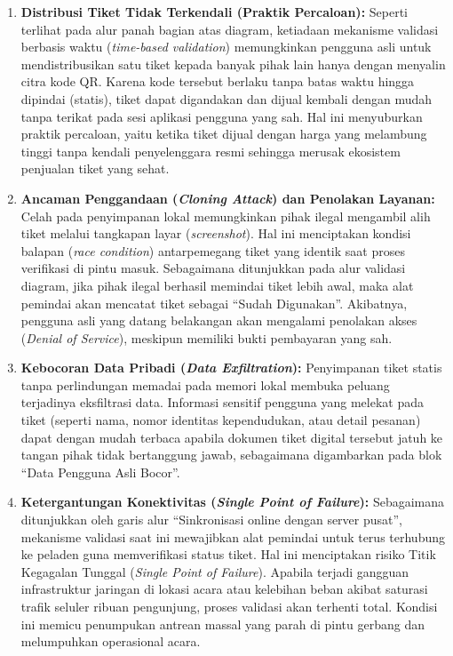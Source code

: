 \begin{enumerate}
    \item \textbf{Distribusi Tiket Tidak Terkendali (Praktik Percaloan):} 
    Seperti terlihat pada alur panah bagian atas diagram, ketiadaan mekanisme validasi berbasis waktu (\textit{time-based validation}) memungkinkan pengguna asli untuk mendistribusikan satu tiket kepada banyak pihak lain hanya dengan menyalin citra kode QR. Karena kode tersebut berlaku tanpa batas waktu hingga dipindai (statis), tiket dapat digandakan dan dijual kembali dengan mudah tanpa terikat pada sesi aplikasi pengguna yang sah. Hal ini menyuburkan praktik percaloan, yaitu ketika tiket dijual dengan harga yang melambung tinggi tanpa kendali penyelenggara resmi sehingga merusak ekosistem penjualan tiket yang sehat.
    
    \item \textbf{Ancaman Penggandaan (\textit{Cloning Attack}) dan Penolakan Layanan:} 
    Celah pada penyimpanan lokal memungkinkan pihak ilegal mengambil alih tiket melalui tangkapan layar (\textit{screenshot}). Hal ini menciptakan kondisi balapan (\textit{race condition}) antarpemegang tiket yang identik saat proses verifikasi di pintu masuk. Sebagaimana ditunjukkan pada alur validasi diagram, jika pihak ilegal berhasil memindai tiket lebih awal, maka alat pemindai akan mencatat tiket sebagai ``Sudah Digunakan''. Akibatnya, pengguna asli yang datang belakangan akan mengalami penolakan akses (\textit{Denial of Service}), meskipun memiliki bukti pembayaran yang sah.
    
    \item \textbf{Kebocoran Data Pribadi (\textit{Data Exfiltration}):} 
    Penyimpanan tiket statis tanpa perlindungan memadai pada memori lokal membuka peluang terjadinya eksfiltrasi data. Informasi sensitif pengguna yang melekat pada tiket (seperti nama, nomor identitas kependudukan, atau detail pesanan) dapat dengan mudah terbaca apabila dokumen tiket digital tersebut jatuh ke tangan pihak tidak bertanggung jawab, sebagaimana digambarkan pada blok ``Data Pengguna Asli Bocor''.

    \item \textbf{Ketergantungan Konektivitas (\textit{Single Point of Failure}):}
    Sebagaimana ditunjukkan oleh garis alur ``Sinkronisasi online dengan server pusat'', mekanisme validasi saat ini mewajibkan alat pemindai untuk terus terhubung ke peladen guna memverifikasi status tiket. Hal ini menciptakan risiko Titik Kegagalan Tunggal (\textit{Single Point of Failure}). Apabila terjadi gangguan infrastruktur jaringan di lokasi acara atau kelebihan beban akibat saturasi trafik seluler ribuan pengunjung, proses validasi akan terhenti total. Kondisi ini memicu penumpukan antrean massal yang parah di pintu gerbang dan melumpuhkan operasional acara.


\end{enumerate}
